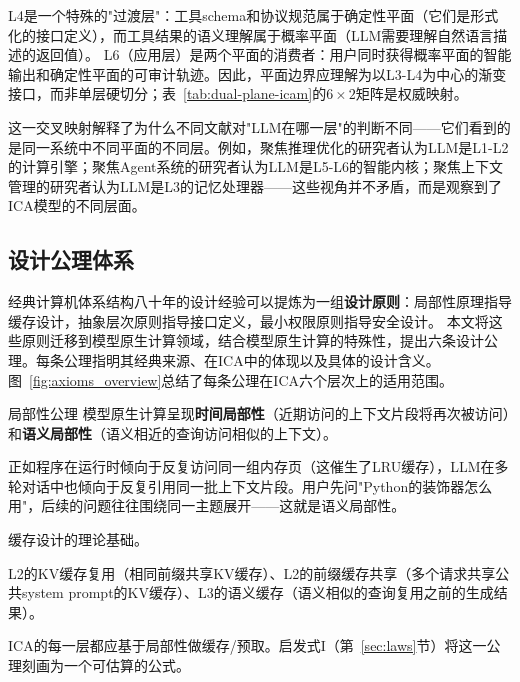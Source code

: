 L4是一个特殊的"过渡层"：工具schema和协议规范属于确定性平面（它们是形式化的接口定义），而工具结果的语义理解属于概率平面（LLM需要理解自然语言描述的返回值）。
L6（应用层）是两个平面的消费者：用户同时获得概率平面的智能输出和确定性平面的可审计轨迹。因此，平面边界应理解为以L3-L4为中心的渐变接口，而非单层硬切分；表~\ref{tab:dual-plane-icam}的$6\times 2$矩阵是权威映射。

这一交叉映射解释了为什么不同文献对"LLM在哪一层"的判断不同——它们看到的是同一系统中不同平面的不同层。例如，聚焦推理优化的研究者认为LLM是L1-L2的计算引擎\cite{kwon2023pagedattention,zhou2024efficientinference}；聚焦Agent系统的研究者认为LLM是L5-L6的智能内核\cite{openai_codex_overview_2026,anthropic_claudecode_overview_2026}；聚焦上下文管理的研究者认为LLM是L3的记忆处理器\cite{memgpt2023,memoryos2025}——这些视角并不矛盾，而是观察到了ICA模型的不同层面。

\subsection{设计公理体系}
\label{sec:icam-axioms}

经典计算机体系结构八十年的设计经验可以提炼为一组\textbf{设计原则}：局部性原理指导缓存设计，抽象层次原则指导接口定义，最小权限原则指导安全设计。
本文将这些原则迁移到模型原生计算领域，结合模型原生计算的特殊性，提出六条设计公理。每条公理指明其经典来源、在ICA中的体现以及具体的设计含义。图~\ref{fig:axioms_overview}总结了每条公理在ICA六个层次上的适用范围。



\begin{axiombox}{\theaxiom\enspace 局部性公理}
模型原生计算呈现\textbf{时间局部性}（近期访问的上下文片段将再次被访问）和\textbf{语义局部性}（语义相近的查询访问相似的上下文）。
\end{axiombox}
\begin{description}[style=nextline,leftmargin=2em,font=\bfseries]
\item[直观解释] 正如程序在运行时倾向于反复访问同一组内存页（这催生了LRU缓存），LLM在多轮对话中也倾向于反复引用同一批上下文片段。用户先问"Python的装饰器怎么用"，后续的问题往往围绕同一主题展开——这就是语义局部性。
\item[经典来源] 缓存设计的理论基础\cite{drepper2007memory}。
\item[ICA体现] L2的KV缓存复用（相同前缀共享KV缓存）、L2的前缀缓存共享（多个请求共享公共system prompt的KV缓存）、L3的语义缓存（语义相似的查询复用之前的生成结果）。
\item[设计含义] ICA的每一层都应基于局部性做缓存/预取。启发式I（第~\ref{sec:laws}节）将这一公理刻画为一个可估算的公式。
\end{description}

